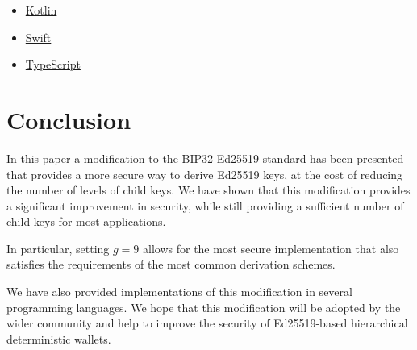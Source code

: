 \documentclass[12pt, a4paper, twocolumn]{article}
\begin{document}
\begin{itemize}
  \item \href{https://github.com/algorandfoundation/bip32-ed25519-kotlin}{Kotlin}
  \item \href{https://github.com/algorandfoundation/bip32-ed25519-swift}{Swift}
  \item \href{https://github.com/ehanoc/ARCs/tree/wallet-api-context/assets/arc-0052}{TypeScript}
\end{itemize}


\section{Conclusion}

In this paper a modification to the BIP32-Ed25519 standard has been presented that provides a more secure way to derive Ed25519 keys, at the cost of reducing the number of levels of child keys. We have shown that this modification provides a significant improvement in security, while still providing a sufficient number of child keys for most applications.

In particular, setting $g=9$ allows for the most secure implementation that also satisfies the requirements of the most common derivation schemes.

We have also provided implementations of this modification in several programming languages. We hope that this modification will be adopted by the wider community and help to improve the security of Ed25519-based hierarchical deterministic wallets.


\nocite{*}


\end{document}
